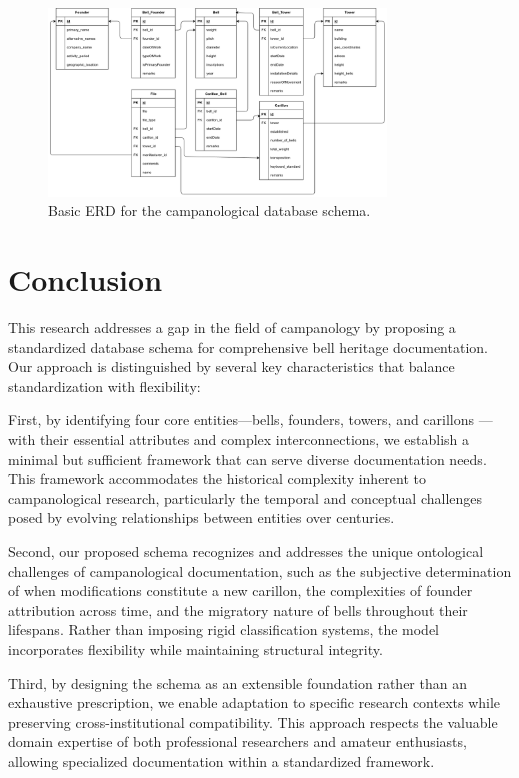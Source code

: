 \documentclass[11pt, a4paper]{article}
\begin{document}
\begin{figure}[h!]
    \centering
    \includegraphics[width=0.8\textwidth]{images/basic_erd.png}
    \caption{Basic ERD for the campanological database schema.}
    \label{fig:basic-erd}
\end{figure}

\section{Conclusion}

This research addresses a gap in the field of campanology by proposing a standardized database schema for comprehensive bell heritage documentation. Our approach is distinguished by several key characteristics that balance standardization with flexibility:

First, by identifying four core entities—bells, founders, towers, and carillons — with their essential attributes and complex interconnections, we establish a minimal but sufficient framework that can serve diverse documentation needs. This framework accommodates the historical complexity inherent to campanological research, particularly the temporal and conceptual challenges posed by evolving relationships between entities over centuries.

Second, our proposed schema recognizes and addresses the unique ontological challenges of campanological documentation, such as the subjective determination of when modifications constitute a new carillon, the complexities of founder attribution across time, and the migratory nature of bells throughout their lifespans. Rather than imposing rigid classification systems, the model incorporates flexibility while maintaining structural integrity.

Third, by designing the schema as an extensible foundation rather than an exhaustive prescription, we enable adaptation to specific research contexts while preserving cross-institutional compatibility. This approach respects the valuable domain expertise of both professional researchers and amateur enthusiasts, allowing specialized documentation within a standardized framework.
\end{document}

